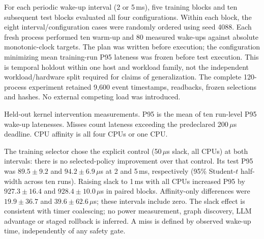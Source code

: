 For each periodic wake-up interval (2 or 5\,ms), five training blocks and ten subsequent test blocks evaluated all four configurations. Within each block, the eight interval/configuration cases were randomly ordered using seed 4088. Each fresh process performed ten warm-up and 80 measured wake-ups against absolute monotonic-clock targets. The plan was written before execution; the configuration minimizing mean training-run P95 lateness was frozen before test execution. This is temporal holdout within one host and workload family, not the independent workload/hardware split required for claims of generalization. The complete 120-process experiment retained 9,600 event timestamps, readbacks, frozen selections and hashes. No external competing load was introduced.

\begin{table}[t]
\centering
\caption{Held-out kernel intervention measurements. P95 is the mean of ten run-level P95 wake-up latenesses. Misses count lateness exceeding the predeclared 200\,$\mu$s deadline. CPU affinity is all four CPUs or one CPU.}
\label{tab:kernel-local}
\small
\begin{adjustbox}{max width=\columnwidth}

\end{adjustbox}
\end{table}

The training selector chose the explicit control (50\,$\mu$s slack, all CPUs) at both intervals: there is no selected-policy improvement over that control. Its test P95 was $89.5\pm9.2$ and $94.2\pm6.9\,\mu$s at 2 and 5\,ms, respectively (95\% Student-$t$ half-width across ten runs). Raising slack to 1\,ms with all CPUs increased P95 by $927.3\pm16.4$ and $928.4\pm10.0\,\mu$s in paired blocks. Affinity-only differences were $19.9\pm36.7$ and $39.6\pm62.6\,\mu$s; these intervals include zero. The slack effect is consistent with timer coalescing; no power measurement, graph discovery, LLM advantage or staged rollback is inferred. A miss is defined by observed wake-up time, independently of any safety gate.

